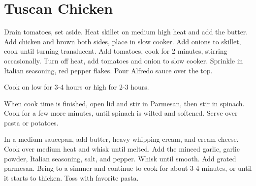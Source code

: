 \section{Tuscan Chicken}
\begin{recipe}




Drain tomatoes, set aside. Heat skillet on medium high heat and add the butter. Add chicken and brown both sides, place in slow cooker. Add onions to skillet, cook until turning translucent. Add tomatoes, cook for 2 minutes, stirring occasionally. Turn off heat, add tomatoes and onion to slow cooker. Sprinkle in Italian seasoning, red pepper flakes. Pour Alfredo sauce over the top.

Cook on low for 3-4 hours or high for 2-3 hours.

When cook time is finished, open lid and stir in Parmesan, then stir in spinach. Cook for a few more minutes, until spinach is wilted and softened. Serve over pasta or potatoes.

In a medium saucepan, add butter, heavy whipping cream, and cream cheese. Cook over medium heat and whisk until melted. Add the minced garlic, garlic powder, Italian seasoning, salt, and pepper. Whisk until smooth. Add grated parmesan. Bring to a simmer and continue to cook for about 3-4 minutes, or until it starts to thicken. Toss with favorite pasta.

\end{recipe}
